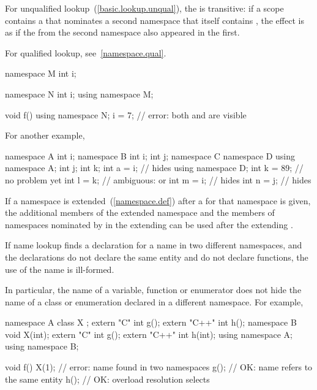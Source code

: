 \pnum
For unqualified lookup~(\ref{basic.lookup.unqual}), the
 is transitive: if a scope contains a
 that nominates a second namespace that itself
contains , the effect is as if the
 from the second namespace also appeared in
the first.
\begin{note} For qualified lookup, see~\ref{namespace.qual}. \end{note}
\begin{example}

\begin{codeblock}
namespace M {
  int i;
}

namespace N {
  int i;
  using namespace M;
}

void f() {
  using namespace N;
  i = 7;            // error: both  and  are visible
}
\end{codeblock}

For another example,

\begin{codeblock}
namespace A {
  int i;
}
namespace B {
  int i;
  int j;
  namespace C {
    namespace D {
      using namespace A;
      int j;
      int k;
      int a = i;    //  hides 
    }
    using namespace D;
    int k = 89;     // no problem yet
    int l = k;      // ambiguous:  or 
    int m = i;      //  hides 
    int n = j;      //  hides 
  }
}
\end{codeblock}
\end{example}


\pnum
If a namespace is extended~(\ref{namespace.def}) after a
 for that namespace is given, the additional
members of the extended namespace and the members of namespaces
nominated by  in the
extending  can be used after the
extending .

\pnum
If name lookup finds a declaration for a name in two different
namespaces, and the declarations do not declare the same entity and do
not declare functions, the use of the name is ill-formed.
\begin{note}
In particular, the name of a variable, function or enumerator does not
hide the name of a class or enumeration declared in a different
namespace. For example,

\begin{codeblock}
namespace A {
  class X { };
  extern "C"   int g();
  extern "C++" int h();
}
namespace B {
  void X(int);
  extern "C"   int g();
  extern "C++" int h(int);
}
using namespace A;
using namespace B;

void f() {
  X(1);             // error: name  found in two namespaces
  g();              // OK: name  refers to the same entity
  h();              // OK: overload resolution selects 
}
\end{codeblock}
\end{note}

